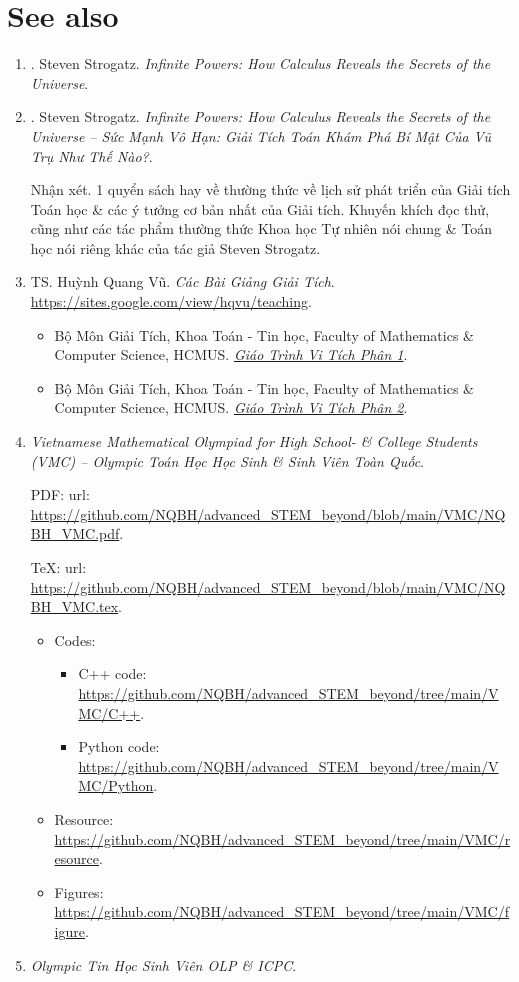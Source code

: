 \documentclass[oneside]{book}
\begin{document}
\section{See also}

\begin{enumerate}
	\item \cite{Strogatz_infinite_power}. {\sc Steven Strogatz}. {\it Infinite Powers: How Calculus Reveals the Secrets of the Universe}.
	
	\item \cite{Strogatz_infinite_power_VN}. {\sc Steven Strogatz}. {\it Infinite Powers: How Calculus Reveals the Secrets of the Universe -- Sức Mạnh Vô Hạn: Giải Tích Toán Khám Phá Bí Mật Của Vũ Trụ Như Thế Nào?}.
	
	{\sf Nhận xét.} 1 quyển sách hay về thường thức về lịch sử phát triển của Giải tích Toán học \& các ý tưởng cơ bản nhất của Giải tích. Khuyến khích đọc thử, cũng như các tác phẩm thường thức Khoa học Tự nhiên nói chung \& Toán học nói riêng khác của tác giả {\sc Steven Strogatz}.
	\item TS. {\sc Huỳnh Quang Vũ}. {\it Các Bài Giảng Giải Tích}. \url{https://sites.google.com/view/hqvu/teaching}.
	\begin{itemize}
		\item Bộ Môn Giải Tích, Khoa Toán - Tin học, Faculty of Mathematics \& Computer Science, HCMUS. \href{https://drive.google.com/file/d/1NA1G0NSIVjnu_zG7e0JTnOvGfFqmuuVg/view}{\it Giáo Trình Vi Tích Phân 1}.
		\item Bộ Môn Giải Tích, Khoa Toán - Tin học, Faculty of Mathematics \& Computer Science, HCMUS. \href{https://drive.google.com/file/d/1Td7-zDZYFdop6f1IXvsPO0S4Cxc7ccd3/view}{\it Giáo Trình Vi Tích Phân 2}.
	\end{itemize}
	\item {\it Vietnamese Mathematical Olympiad for High School- \& College Students (VMC) -- Olympic Toán Học Học Sinh \& Sinh Viên Toàn Quốc}.
	
	PDF: {\sc url}: \url{https://github.com/NQBH/advanced_STEM_beyond/blob/main/VMC/NQBH_VMC.pdf}.
	
	\TeX: {\sc url}: \url{https://github.com/NQBH/advanced_STEM_beyond/blob/main/VMC/NQBH_VMC.tex}.
	\begin{itemize}
		\item Codes:
		\begin{itemize}
			\item C++ code: \url{https://github.com/NQBH/advanced_STEM_beyond/tree/main/VMC/C++}.
			\item Python code: \url{https://github.com/NQBH/advanced_STEM_beyond/tree/main/VMC/Python}.
		\end{itemize}
		\item Resource: \url{https://github.com/NQBH/advanced_STEM_beyond/tree/main/VMC/resource}.
		\item Figures: \url{https://github.com/NQBH/advanced_STEM_beyond/tree/main/VMC/figure}.
	\end{itemize}
	\item {\it Olympic Tin Học Sinh Viên OLP \& ICPC}.
	

\end{enumerate}
\end{document}

